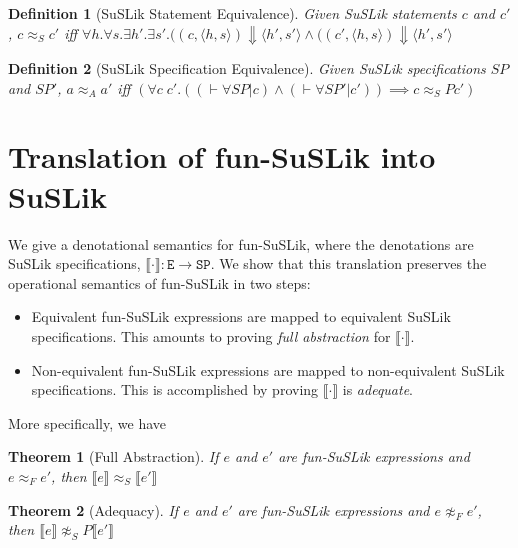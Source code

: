 \documentclass[10pt]{article}
\newtheorem{theorem}{Theorem}
\newtheorem{definition}{Definition}
\newcommand{\ttt}[1]{\texttt{#1}}
\newcommand{\ra}{\ensuremath{\rightarrow}}
\newcommand{\BigStep}{\ensuremath{\Downarrow}}
\newcommand{\sem} [1] {\llbracket#1\rrbracket}
\begin{document}
\noindent
\begin{definition}[SuSLik Statement Equivalence]
  Given SuSLik statements $c$ and $c'$, $c \approx_S c'$ iff
    $\forall h. \forall s. \exists h'. \exists s'.
      ((c, \langle h, s \rangle) \BigStep \langle h' , s' \rangle
      \land
      ((c', \langle h, s \rangle) \BigStep \langle h' , s' \rangle$
\end{definition}

\begin{definition}[SuSLik Specification Equivalence]
  Given SuSLik specifications $SP$ and $SP'$, $a \approx_A a'$ iff
    $(\forall c\; c'. ((\vdash \forall SP | c) \land (\vdash \forall SP' | c')) \implies c \approx_SP c')$
\end{definition}

\section{Translation of fun-SuSLik into SuSLik}

We give a denotational semantics for fun-SuSLik, where the denotations are SuSLik specifications, $\sem{\cdot} : \ttt{E} \ra \ttt{SP}$.
We show that this translation preserves the operational semantics of fun-SuSLik in two steps:

\begin{itemize}
  \item Equivalent fun-SuSLik expressions are mapped to equivalent SuSLik specifications. This amounts to proving
    \textit{full abstraction} for $\sem{\cdot}$.
  \item Non-equivalent fun-SuSLik expressions are mapped to non-equivalent SuSLik specifications.
    This is accomplished by proving $\sem{\cdot}$ is \textit{adequate}.
\end{itemize}

\noindent
More specifically, we have

\begin{theorem}[Full Abstraction]
  If $e$ and $e'$ are fun-SuSLik expressions and $e \approx_F e'$, then $\sem{e} \approx_S \sem{e'}$
\end{theorem}

\begin{theorem}[Adequacy]
  If $e$ and $e'$ are fun-SuSLik expressions and $e \not\approx_F e'$, then $\sem{e} \not\approx_SP \sem{e'}$
\end{theorem}
\end{document}
